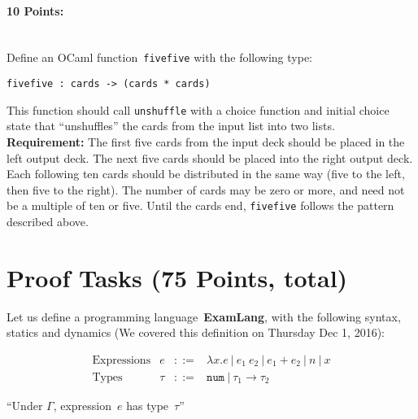 \documentclass{article}
\newcommand{\arr}{\rightarrow}
\begin{document}
\paragraph{10 Points:}~\\
Define an OCaml function~\texttt{fivefive} with the following type:
\begin{verbatim}
fivefive : cards -> (cards * cards)
\end{verbatim}
This function should call \texttt{unshuffle} with a choice function
and initial choice state that ``unshuffles'' the cards from the input
list into two lists.
%
\\[2mm]
\noindent
\textbf{Requirement:} The first five cards from the input deck
should be placed in the left output deck.  The next five cards should
be placed into the right output deck.  Each following ten cards should
be distributed in the same way (five to the left, then five to the
right).  The number of cards may be zero or more, and need not be a
multiple of ten or five.  Until the cards end, \texttt{fivefive}
follows the pattern described above.

\section*{Proof Tasks (75 Points, total)}

Let us define a programming language~\textbf{ExamLang}, with the
following syntax, statics and dynamics (We covered this definition on
Thursday Dec 1, 2016):

\[\begin{array}{ccll}
\textrm{Expressions}  & e & ::= & \lambda x.e ~|~ e_1~e_2 ~|~ e_1 + e_2 ~|~ n ~|~ x
\\
\textrm{Types} & \tau & ::= & \texttt{num} ~|~ \tau_1 \arr \tau_2
\end{array}
\]

``Under $\Gamma$, expression~$e$ has type~$\tau$''
\end{document}
